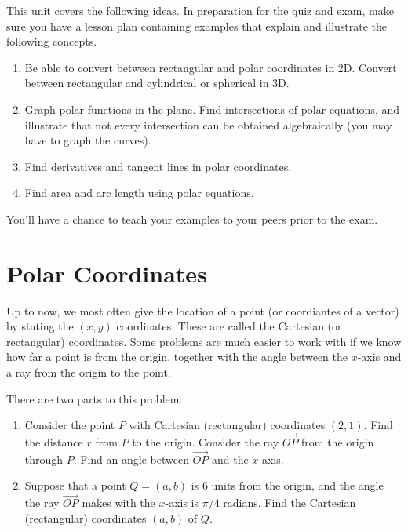 
\noindent 
This unit covers the following ideas. In preparation for the quiz and exam, make sure you have a lesson plan containing examples that explain and illustrate the following concepts.  
\begin{enumerate}

\item Be able to convert between rectangular and polar coordinates in 2D. Convert between rectangular and cylindrical or spherical in 3D.
\item Graph polar functions in the plane. Find intersections of polar equations, and illustrate that not every intersection can be obtained algebraically (you may have to graph the curves).
\item Find derivatives and tangent lines in polar coordinates.
\item Find area and arc length using polar equations.

\end{enumerate}
You'll have a chance to teach your examples to your peers prior to the exam.

\section{Polar Coordinates}
Up to now, we most often give the location of a point (or coordiantes of a vector) by stating the $(x,y)$ coordinates.  These are called the Cartesian (or rectangular) coordinates.  Some problems are much easier to work with if we know how far a point is from the origin, together with the angle between the $x$-axis and a ray from the origin to the point.

\begin{problem}
There are two parts to this problem.
\begin{enumerate}
\item Consider the point $P$ with Cartesian (rectangular) coordinates $(2,1)$.  Find the distance $r$ from $P$ to the origin. Consider the ray $\vec {OP}$ from the origin through $P$. Find an angle between $\vec{OP}$ and the $x$-axis. 

\item Suppose that a point $Q=(a,b)$ is 6 units from the origin, and the angle the ray $\vec {OP}$ makes with the $x$-axis is $\pi/4$ radians.  Find the Cartesian (rectangular) coordinates $(a,b)$ of $Q$.
\end{enumerate}

 
\end{problem}

